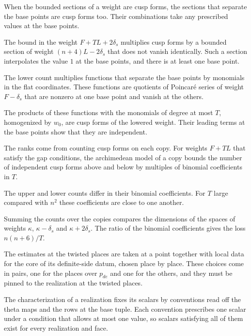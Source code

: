 When the bounded sections of a weight are cusp forms, the sections that separate the base points are cusp forms
too. Their combinations take any prescribed values at the base points.

The bound in the weight $F+TL+2\delta_s$ multiplies cusp forms by a bounded section of weight
$(n+4)L-2\delta_s$ that does not vanish identically. Such a section interpolates the value $1$ at the base
points, and there is at least one base point.

The lower count multiplies functions that separate the base points by monomials in the flat coordinates.
These functions are quotients of Poincaré series of weight $F-\delta_s$ that are nonzero at one base point
and vanish at the others.

The products of these functions with the monomials of degree at most $T$, homogenized by $w_0$, are cusp
forms of the lowered weight. Their leading terms at the base points show that they are independent.

The ranks come from counting cusp forms on each copy. For weights $F+TL$ that satisfy the gap
conditions, the archimedean model of a copy bounds the number of independent cusp forms above and
below by multiples of binomial coefficients in $T$.

The upper and lower counts differ in their binomial coefficients. For $T$ large compared with $n^2$
these coefficients are close to one another.

Summing the counts over the copies compares the dimensions of the spaces of weights $\kappa$,
$\kappa-\delta_s$ and $\kappa+2\delta_s$. The ratio of the binomial coefficients gives the loss
$n(n+6)/T$.

The estimates at the twisted places are taken at a point together with local data for the core of
its definite-side datum, chosen place by place. These choices come in pairs, one for the places over
$p_{de}$ and one for the others, and they must be pinned to the realization at the twisted places.

The characterization of a realization fixes its scalars by conventions read off the theta maps and the
rows at the base tuple. Each convention prescribes one scalar under a condition that allows at most one
value, so scalars satisfying all of them exist for every realization and face.

